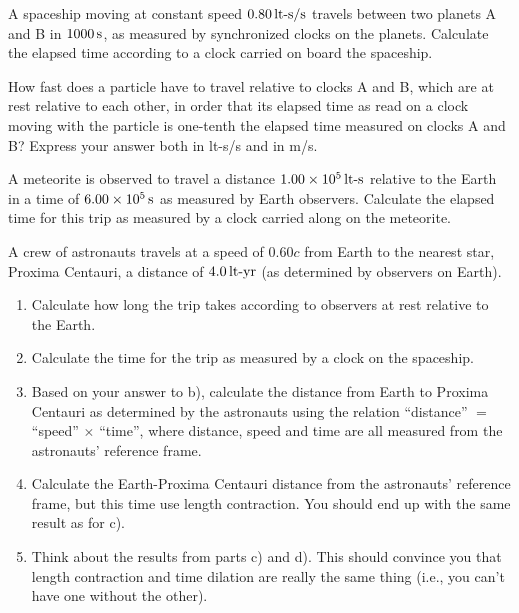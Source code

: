 \begin{problem}
A spaceship moving at constant speed $0.80\,\mbox{lt-s/s}$
travels between two planets A and B in $1000\,\mbox{s}$, as measured by
synchronized clocks on the planets.  Calculate the elapsed time
according to a clock carried on board the spaceship.  
\end{problem}

\begin{problem}
How fast does a particle have to travel relative to clocks A and
B, which are at rest relative to each other, in order that its elapsed
time as read on a clock moving with the particle is one-tenth the
elapsed time measured on clocks A and B?  Express your answer both in
lt-s/s and in m/s.
\label{prob:time_dilation1}
\end{problem}
  
\begin{problem}
  A meteorite is observed to travel a distance $1.00 \times
  10^5\,\mbox{lt-s}$ relative to the Earth in a time of $6.00 \times
  10^5\,\mbox{s}$ as measured by Earth observers.  Calculate the
  elapsed time for this trip as measured by a clock carried along on
  the meteorite.
\label{prob:meteorite}
\end{problem}

\begin{problem}
A crew of astronauts travels at a speed of $0.60c$ from Earth to
the nearest star, Proxima Centauri, a distance of $4.0\,\mbox{lt-yr}$ 
(as determined by observers on Earth).
   \begin{enumerate}
   \item Calculate how long the trip takes according to observers at
   rest relative to the Earth. 
   \item Calculate the time for the trip as measured by a clock on the
   spaceship. 
   \item Based on your answer to b), calculate the distance from
   Earth to Proxima Centauri as determined by the astronauts using the
   relation ``distance'' $=$ ``speed'' $\times$ ``time'', where 
   distance, speed and
   time are all measured from the astronauts' reference frame.
   \item Calculate the Earth-Proxima Centauri distance from the
   astronauts' reference frame, but this time use length contraction.
   You should end up with the same result as for c).
   \item Think about the results from parts c) and d).  This should
   convince you that length contraction and time dilation are really
   the same thing (i.e., you can't have one without the other).  
   \end{enumerate}
\label{prob:alpha_centauri}
\end{problem}

